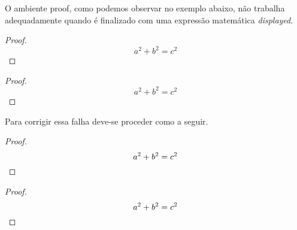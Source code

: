 O ambiente \textsf{proof}, como podemos observar no exemplo abaixo, não trabalha adequadamente quando é finalizado com uma expressão matemática \textit{displayed}. \\
\begin{minipage}[t]{0.47\linewidth} \vspace{-8pt}
    \begin{latexcode}
        \begin{proof}
            $$a^2 + b^2 = c^2$$
        \end{proof}
    \end{latexcode}
\end{minipage} \hfill
\begin{minipage}[t]{0.47\linewidth} \vspace{0pt}
    \begin{proof}
        $$a^2 + b^2 = c^2$$
    \end{proof}
\end{minipage}

Para corrigir essa falha deve-se proceder como a seguir. \\
\begin{minipage}[t]{0.47\linewidth} \vspace{-8pt}
    \begin{latexcode}
        \begin{proof}
            $$a^2 + b^2 = c^2 \qedhere$$
        \end{proof}
    \end{latexcode}
\end{minipage} \hfill
\begin{minipage}[t]{0.47\linewidth} \vspace{0pt}
    \begin{proof}
        $$a^2 + b^2 = c^2 \qedhere$$
    \end{proof}
\end{minipage}
